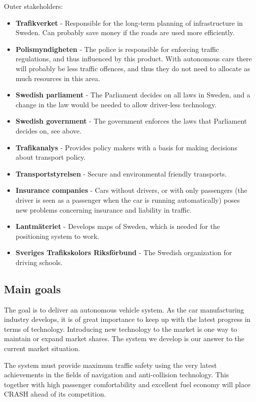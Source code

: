\documentclass{article}
\begin{document}
\noindent Outer stakeholders:
\begin{itemize}
\item \textbf{Trafikverket} - Responsible for the long-term planning of infrastructure in Sweden. Can probably save money if the roads are used more efficiently. 
\item \textbf{Polismyndigheten} - The police is responsible for enforcing traffic regulations, and thus influenced by this product. With autonomous cars there will probably be less traffic offences, and thus they do not need to allocate as much resources in this area. 
\item \textbf{Swedish parliament} - The Parliament decides on all laws in Sweden, and a change in the law would be needed to allow driver-less technology.
\item \textbf{Swedish government} - The government enforces the laws that Parliament decides on, see above.
\item \textbf{Trafikanalys} - Provides policy makers with a basis for making decisions about transport policy.
\item \textbf{Transportstyrelsen} - Secure and environmental friendly transports.
\item \textbf{Insurance companies} - Cars without drivers, or with only passengers (the driver is seen as a passenger when the car is running automatically) poses new problems concerning insurance and liability in traffic.
\item \textbf{Lantmäteriet} - Develops maps of Sweden, which is needed for the positioning system to work.
\item \textbf{Sveriges Trafikskolors Riksförbund} - The Swedish organization for driving schools.
\end{itemize}

\subsection{Main goals}
\noindent The goal is to deliver an autonomous vehicle system. As the car manufacturing industry develops, it is of great importance to keep up with the latest progress in terms of technology. Introducing new technology to the market is one way to maintain or expand market shares. The system we develop is our answer to the current market situation.

The system must provide maximum traffic safety using the very latest achievements in the fields of navigation and anti-collision technology. This together with high passenger comfortability and excellent fuel economy will place CRASH ahead of its competition.
\end{document}
